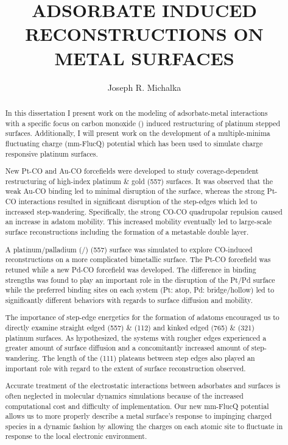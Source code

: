 \begin{abstract}
\label{chap:abstract}
\title{ADSORBATE INDUCED RECONSTRUCTIONS ON METAL SURFACES}
\author{Joseph R. Michalka}
In this dissertation I present work on the modeling of adsorbate-metal
interactions with a specific focus on carbon monoxide () induced
restructuring of platinum stepped surfaces. Additionally, I will present work
on the development of a multiple-minima fluctuating charge (mm-FlucQ) potential
which has been used to simulate charge responsive platinum surfaces.

New Pt-CO and Au-CO forcefields were developed to study coverage-dependent
restructuring of high-index platinum \& gold (557) surfaces. It was observed
that the weak Au-CO binding led to minimal disruption of the surface, whereas
the strong Pt-CO interactions resulted in significant disruption of the
step-edges which led to increased step-wandering. Specifically, the strong
CO-CO quadrupolar repulsion caused an increase in adatom mobility. This
increased mobility eventually led to large-scale surface reconstructions
including the formation of a metastable double layer.

A platinum/palladium (/) (557) surface was simulated to explore
CO-induced reconstructions on a more complicated bimetallic surface. The Pt-CO
forcefield was retuned while a new Pd-CO forcefield was developed.  The
difference in binding strengths was found to play an important role in the
disruption of the Pt/Pd surface while the preferred binding sites on each
system (Pt: atop, Pd: bridge/hollow) led to significantly different behaviors
with regards to surface diffusion and mobility.

The importance of step-edge energetics for the formation of adatoms encouraged
us to directly examine straight edged (557) \& (112) and kinked edged (765) \&
(321) platinum surfaces.  As hypothesized, the systems with rougher edges
experienced a greater amount of surface diffusion and a concomitantly increased
amount of step-wandering. The length of the (111) plateaus between step edges
also played an important role with regard to the extent of surface
reconstruction observed.

Accurate treatment of the electrostatic interactions between adsorbates and
surfaces is often neglected in molecular dynamics simulations because of the
increased computational cost and difficulty of implementation.  Our new
mm-FlucQ potential allows us to more properly describe a metal surface's
response to impinging charged species in a dynamic fashion by allowing the
charges on each atomic site to fluctuate in response to the local electronic
environment.
\end{abstract}

